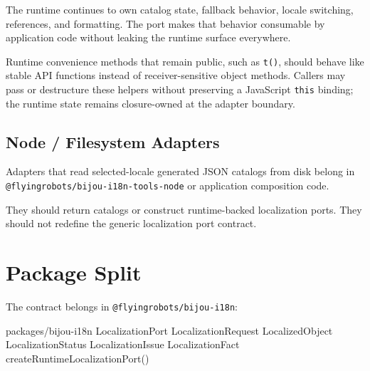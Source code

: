 The runtime continues to own catalog state, fallback behavior, locale switching, references, and formatting. The port makes that behavior consumable by application code without leaking the runtime surface everywhere.

Runtime convenience methods that remain public, such as \texttt{t\allowbreak{}(\allowbreak{})}, should behave like stable API functions instead of receiver-sensitive object methods. Callers may pass or destructure these helpers without preserving a JavaScript \texttt{t\allowbreak{}h\allowbreak{}i\allowbreak{}s} binding; the runtime state remains closure-owned at the adapter boundary.

\subsection{Node / Filesystem Adapters}\label{record-195-node-filesystem-adapters}

Adapters that read selected-locale generated JSON catalogs from disk belong in \texttt{@\allowbreak{}f\allowbreak{}l\allowbreak{}y\allowbreak{}i\allowbreak{}n\allowbreak{}g\allowbreak{}r\allowbreak{}o\allowbreak{}b\allowbreak{}o\allowbreak{}t\allowbreak{}s\allowbreak{}/\allowbreak{}b\allowbreak{}i\allowbreak{}j\allowbreak{}o\allowbreak{}u\allowbreak{}-\allowbreak{}i\allowbreak{}1\allowbreak{}8\allowbreak{}n\allowbreak{}-\allowbreak{}t\allowbreak{}o\allowbreak{}o\allowbreak{}l\allowbreak{}s\allowbreak{}-\allowbreak{}n\allowbreak{}o\allowbreak{}d\allowbreak{}e} or application composition code.

They should return catalogs or construct runtime-backed localization ports. They should not redefine the generic localization port contract.

\section{Package Split}\label{record-195-package-split}

The contract belongs in \texttt{@\allowbreak{}f\allowbreak{}l\allowbreak{}y\allowbreak{}i\allowbreak{}n\allowbreak{}g\allowbreak{}r\allowbreak{}o\allowbreak{}b\allowbreak{}o\allowbreak{}t\allowbreak{}s\allowbreak{}/\allowbreak{}b\allowbreak{}i\allowbreak{}j\allowbreak{}o\allowbreak{}u\allowbreak{}-\allowbreak{}i\allowbreak{}1\allowbreak{}8\allowbreak{}n}:

\begin{CodeBlock}
packages/bijou-i18n
  LocalizationPort
  LocalizationRequest
  LocalizedObject
  LocalizationStatus
  LocalizationIssue
  LocalizationFact
  createRuntimeLocalizationPort()
\end{CodeBlock}

